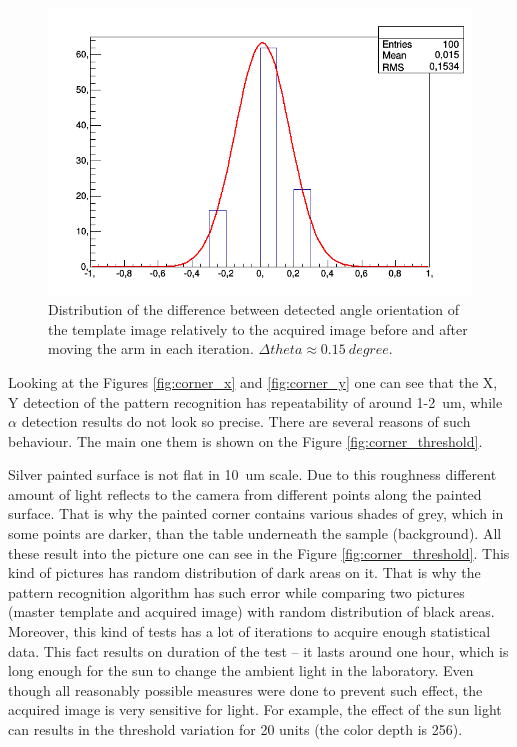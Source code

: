 \begin{figure}[ht]\centering
\includegraphics[width=0.8\linewidth]{Data/Precision_tests/Corner_c_theta.png}
\caption{Distribution of the difference between detected angle orientation of the template image relatively to the acquired image before and after moving the arm in each iteration. $\Delta theta \approx 0.15 ~degree$. }
\label{fig:corner_theta}
\end{figure}

Looking at the Figures \ref{fig:corner_x} and \ref{fig:corner_y} one can see that the X, Y detection of the pattern recognition has repeatability of around 1-2~um, while $\alpha$ detection results do not look so precise. There are several reasons of such behaviour. The main one them is shown on the Figure \ref{fig:corner_threshold}.

Silver painted surface is not flat in 10~um scale. Due to this roughness different amount of light reflects to the camera from different points along the painted surface. That is why the painted corner contains various shades of grey, which in some points are darker, than the table underneath the sample (background). All these result into the picture one can see in the Figure \ref{fig:corner_threshold}. This kind of pictures has random distribution of dark areas on it. That is why the pattern recognition algorithm has such error while comparing two pictures (master template and acquired image) with random distribution of black areas. Moreover, this kind of tests has a lot of iterations to acquire enough statistical data. This fact results on duration of the test -- it lasts around one hour, which is long enough for the sun to change the ambient light in the laboratory. Even though all reasonably possible measures were done to prevent such effect, the acquired image is very sensitive for light. For example, the effect of the sun light can results in the threshold variation for 20 units (the color depth is 256).

